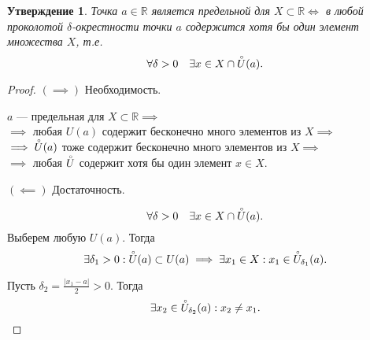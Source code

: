 \documentclass[a4paper,12pt]{article} %
\newtheorem{lemma}{Утверждение}[subsection]
\theoremstyle{remark}
\begin{document}
\begin{lemma}
	Точка $a\in \mathbb{R}$ является предельной для $X\subset \mathbb{R}\iff$ в любой проколотой $\delta$-окрестности точки $a$ содержится хотя бы один элемент множества $X$, т.е.
	\[
		\forall \delta>0 \quad \exists x\in X \cap \accentset{\circ}{U}(a)
	.\]
\end{lemma}
\begin{proof}
	$(\implies)$ Необходимость.
	
	$a$ --- предельная для $X\subset \mathbb{R}\implies$ \\ 
	\indent $\implies$ любая $U(a)$ содержит бесконечно много элементов из $X \implies$ \\ 
	\indent \indent $\implies \accentset{\circ}{U}(a)$ тоже содержит бесконечно много элементов из $X\implies$ \\ 
	\indent \indent \indent $\implies$ любая $\accentset{\circ}{U}$ содержит хотя бы один элемент $x\in X$.

	$(\impliedby)$ Достаточность.

	\[
		\forall \delta>0 \quad \exists x\in X \cap \accentset{\circ}{U}(a)
	.\]
	Выберем любую $U(a)$. Тогда
\[
\exists \delta_1>0 : \accentset{\circ}{U}(a)\subset U(a) \implies \exists x_1\in X : x_1\in \accentset{\circ}{U}_{\delta_1}(a)
.\] 
\begin{center}
\end{center}

Пусть $\delta_2 = \frac{|x_1-a|}{2} > 0$. Тогда
\[
	\exists x_2 \in \accentset{\circ}{U}_{\delta_2}(a) : x_2\neq x_1
.\] 


\end{proof}
\end{document}
